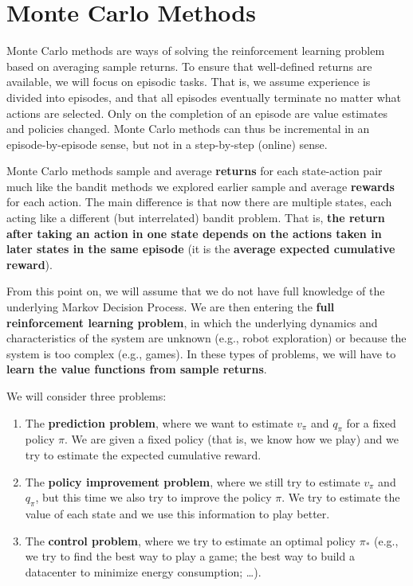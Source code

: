 \section{Monte Carlo Methods}
Monte Carlo methods are ways of solving the reinforcement learning problem based on averaging sample returns. To ensure that well-defined returns are available, we will focus on episodic tasks. That is, we assume experience is divided into episodes, and that all episodes eventually terminate no matter what actions are selected. Only on the completion of an episode are value estimates and policies changed. Monte Carlo methods can thus be incremental in an episode-by-episode sense, but not in a step-by-step (online) sense.

Monte Carlo methods sample and average \textbf{returns} for each state-action pair much like the bandit methods we explored earlier sample and average \textbf{rewards} for each action. The main difference is that now there are multiple states, each acting like a different (but interrelated) bandit problem. That is, \textbf{the return after taking an action in one state depends on the actions taken in later states in the same episode} (it is the \textbf{average expected cumulative reward}). 

From this point on, we will assume that we do not have full knowledge of the underlying Markov Decision Process. We are then entering the \textbf{full reinforcement learning problem}, in which the underlying dynamics and characteristics of the system are unknown (e.g., robot exploration) or because the system is too complex (e.g., games). In these types of problems, we will have to \textbf{learn the value functions from sample returns}.

We will consider three problems:
\begin{enumerate}
    \item The \textbf{prediction problem}, where we want to estimate $v_\pi$ and $q_\pi$ for a fixed policy $\pi$. We are given a fixed policy (that is, we know how we play) and we try to estimate the expected cumulative reward.
    \item The \textbf{policy improvement problem}, where we still try to estimate $v_\pi$ and $q_\pi$, but this time we also try to improve the policy $\pi$. We try to estimate the value of each state and we use this information to play better.
    \item The \textbf{control problem}, where we try to estimate an optimal policy $\pi_*$ (e.g., we try to find the best way to play a game; the best way to build a datacenter to minimize energy consumption; …).
\end{enumerate}

